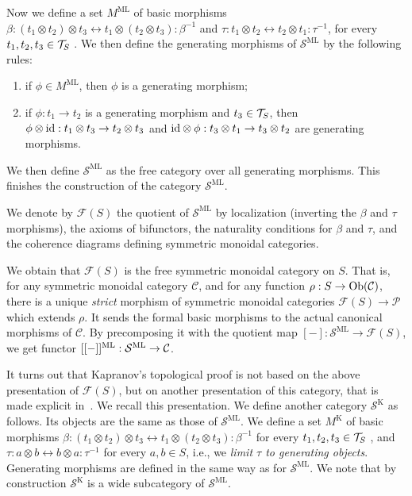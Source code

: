 Now we define a set $M^{\mathrm{ML}}$ of basic morphisms $\beta: (t_1 \otimes t_2) \otimes t_3 \leftrightarrow t_1 \otimes (t_2\otimes t_3) : \beta^{-1}$  and $\tau: t_1\otimes t_2 \leftrightarrow t_2 \otimes t_1 : \tau^{-1}$,  for every $t_1,t_2,t_3  \in {\cal T}_S$
.
We then define the generating morphisms of  $\mathcal{S}^{\mathrm{ML}}$ by the following rules:
\begin{enumerate}
    \item if $\phi \in M^{\mathrm{ML}}$, then $\phi$ is a generating morphism; 
    \item if $\phi : t_1 \to t_2$ is a generating morphism and $t_3 \in {\cal T}_S$, then $\phi \otimes \mathrm{id} : t_1 \otimes t_3 \to t_2 \otimes t_3$ and $\mathrm{id} \otimes \phi : t_3 \otimes t_1 \to t_3 \otimes t_2$ are generating morphisms.
\end{enumerate}
We then define $\mathcal{S}^{\mathrm{ML}}$ as the free category over all generating morphisms. 
This finishes the construction of the category $\mathcal{S}^{\mathrm{ML}}$.

\begin{definition}
    We denote  by $\mathcal{F}(S)$ the quotient of $\mathcal{S}^{\mathrm{ML}}$ by localization (inverting the $\beta$ and $\tau$ morphisms), the axioms of bifunctors, the naturality conditions for $\beta$ and $\tau$, and the coherence diagrams defining   symmetric monoidal categories.
    \end{definition}

We obtain that $\mathcal{F}(S)$ is the free  symmetric monoidal category on $S$. 
That is, for any symmetric monoidal category $\mathcal{C}$, and for any function $\rho : S \to \mathrm{Ob}(\mathcal{C})$, there is a unique \emph{strict} morphism of symmetric monoidal categories $\mathcal{F}(S) \to \mathcal{P}$ which extends $\rho$. It sends the formal basic morphisms to the actual canonical morphisms of $\mathcal{C}$.
By precomposing it with the quotient map $[-]:\mathcal{S}^{\mathrm{ML}} \to \mathcal{F}(S)$, we get  functor $[[-]]^{\mathrm{ML}}:\mathcal{S}^{\mathrm{ML}} \to \mathcal{C}$.

\smallskip
It turns out that Kapranov's topological proof is not based on the above presentation of $\mathcal{F}(S)$, but  on another presentation of this category, that is made explicit in~\cite{baralicSimplePermutoassociahedron2019}. 
We recall this presentation. We define another category $\mathcal{S}^{\mathrm{K}}$ as follows. Its objects are the same as those of $\mathcal{S}^{\mathrm{ML}}$. We define a set $M^{\mathrm{K}}$ of basic morphisms $\beta: (t_1 \otimes t_2) \otimes t_3 \leftrightarrow t_1 \otimes (t_2\otimes t_3) : \beta^{-1}$ for every $t_1,t_2,t_3  \in {\cal T}_S$ , and $\tau: a\otimes b \leftrightarrow b \otimes a : \tau^{-1}$ for every $a,b  \in S$, i.e., we \emph{limit $\tau$ to generating objects}.
Generating morphisms are defined in the same way as for $\mathcal{S}^{\mathrm{ML}}$.
We note that by construction $\mathcal{S}^{\mathrm{K}}$ is a wide subcategory of $\mathcal{S}^{\mathrm{ML}}$.

